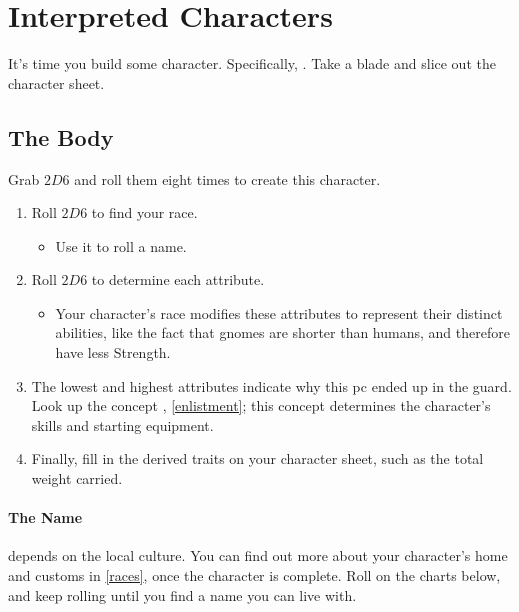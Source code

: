 
\chapter{Interpreted Characters}
\label{character_rolls}
\label{randomCharacterCreation}

It's time you build some character.
Specifically, .
Take a blade and slice out the character sheet.

\raceChart

\section{The Body}
\begin{multicols}{2}
\noindent
Grab $2D6$ and roll them eight times to create this character.

\begin{enumerate}
  \item
  Roll $2D6$ to find your race.
  \label{ccRaceRoll}
  \begin{itemize}
    \item
    Use it to roll a name.
  \end{itemize}
  \item
  Roll $2D6$ to determine each \gls{attribute}.
  \label{ccAttributeRoll}
  \begin{itemize}
    \item
    Your character's race modifies these \glspl{attribute} to represent their distinct abilities, like the fact that gnomes are shorter than humans, and therefore have less Strength.
  \end{itemize}
  \item
  The lowest and highest \glspl{attribute} indicate why this \gls{pc} ended up in the \gls{guard}.
  Look up the concept , \autoref{enlistment}; this concept determines the character's \glspl{skill} and starting equipment.
  \label{ccConcept}
  \item
  Finally, fill in the derived \glspl{trait} on your character sheet, such as the total \gls{weight} carried.
  \label{ccDerived}
\end{enumerate}
\label{raceRoll}

\subsubsection{The Name}
depends on the local culture.
You can find out more about your character's home and customs in \autoref{races}, once the character is complete.
Roll on the charts below, and keep rolling until you find a name you can live with.

\end{multicols}

